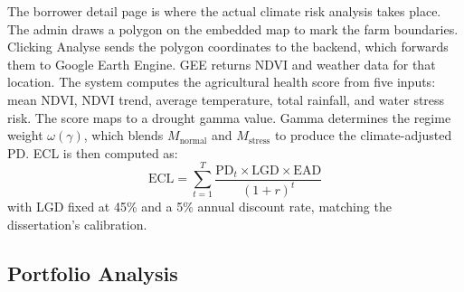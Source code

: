 \documentclass[12pt,a4paper]{article}
\newcommand{\Mnormal}{M_{\text{normal}}}
\newcommand{\Mstress}{M_{\text{stress}}}
\newcommand{\ECL}{\text{ECL}}
\newcommand{\EAD}{\text{EAD}}
\newcommand{\LGD}{\text{LGD}}
\newcommand{\PD}{\text{PD}}
\begin{document}
The borrower detail page is where the actual climate risk analysis takes place. The admin draws a polygon on the embedded map to mark the farm boundaries. Clicking Analyse sends the polygon coordinates to the backend, which forwards them to Google Earth Engine. GEE returns NDVI and weather data for that location. The system computes the agricultural health score from five inputs: mean NDVI, NDVI trend, average temperature, total rainfall, and water stress risk. The score maps to a drought gamma value. Gamma determines the regime weight $\omega(\gamma)$, which blends $\Mnormal$ and $\Mstress$ to produce the climate-adjusted PD. ECL is then computed as:
\[
\ECL = \sum_{t=1}^{T} \frac{\PD_t \times \LGD \times \EAD}{(1+r)^t}
\]
with LGD fixed at 45\% and a 5\% annual discount rate, matching the dissertation's calibration.

\subsection{Portfolio Analysis}
\end{document}
